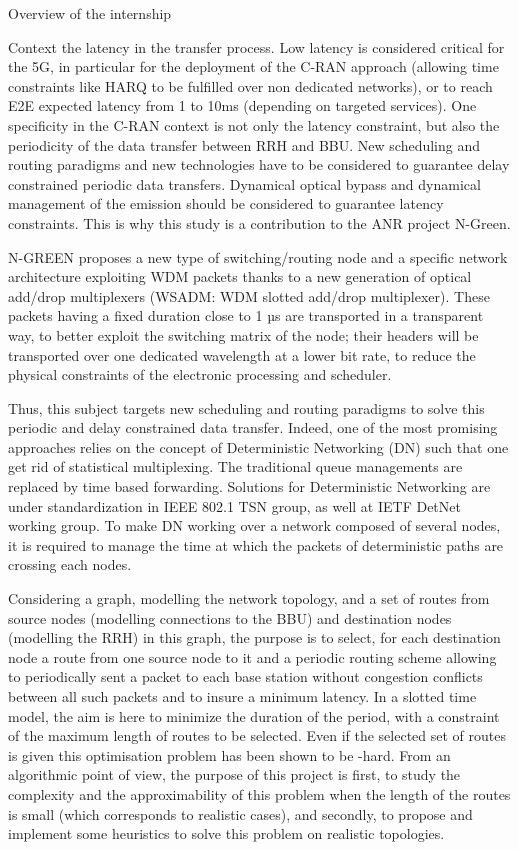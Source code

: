 \documentclass[a4paper,10pt]{report}
\begin{document}
\begin{chapter}{Overview of the internship}
\begin{section}{Context}
the latency in the transfer process.  Low latency is considered critical for the 5G, in particular for the deployment of the C-RAN approach 
(allowing time constraints like HARQ to be fulfilled over non dedicated networks), or to reach E2E expected latency from 1 to 10ms 
(depending on targeted services). One specificity in the C-RAN context is not only the latency constraint, but also the periodicity of 
the data transfer between RRH and BBU.  New scheduling and routing paradigms and new technologies have to be considered to  guarantee 
delay constrained periodic data transfers. Dynamical optical bypass and dynamical management of the emission should be considered to
guarantee latency constraints. This is why this study is a contribution to the ANR project N-Green.

N-GREEN proposes a new type of switching/routing node and a specific network architecture exploiting WDM packets thanks to a new generation of optical add/drop multiplexers (WSADM: WDM slotted add/drop multiplexer). These packets having a fixed duration close to 1 µs are transported in a transparent way, to better exploit the switching matrix of the node; their headers will be transported over one dedicated wavelength at a lower bit rate, to reduce the physical constraints of the electronic processing and scheduler.

 Thus, this subject targets new scheduling and routing paradigms to solve this periodic and delay constrained data transfer.
 Indeed, one of the most promising approaches relies on the concept of Deterministic Networking (DN) such that one get rid of
 statistical multiplexing. The traditional queue managements are replaced by time based forwarding. Solutions for Deterministic 
 Networking are under standardization in IEEE 802.1 TSN group, as well at IETF DetNet working group.  To make DN working over a
 network composed of several nodes, it is required to manage the time at which the packets of deterministic paths are crossing each nodes. 

Considering a graph, modelling the network topology, and a set of routes from source nodes (modelling connections to the BBU) and destination 
nodes (modelling the RRH) in this graph, the purpose is to select, for each destination node a route from one source node to it and a periodic 
routing scheme allowing to periodically sent a packet to each base station without congestion conflicts between all such packets and to insure a minimum latency. In a slotted time model, the aim is here to minimize the duration of the period, with a constraint of the maximum length of routes to be
selected. Even if the selected set of routes is given this optimisation problem has been shown to be  \NP-hard. From an algorithmic point of view,
the purpose of this project is first, to study the complexity and the approximability of this problem when the length of the routes is small
(which corresponds to realistic cases), and secondly, to propose and implement some heuristics to solve this problem on realistic topologies.



\end{section}
\end{chapter}
\end{document}
